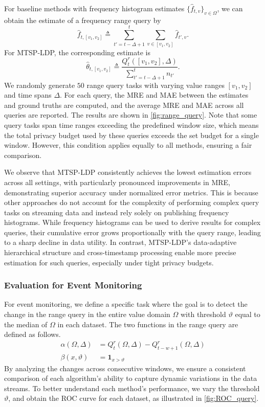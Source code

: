 \documentclass[acmsmall]{acmart}
\newcommand{\indr}[1]{\mathbf{1}_{#1}}
\begin{document}


For baseline methods with frequency histogram estimates
$\{\hat{f}_{t,v}\}_{v\in\Omega}$, we can obtain the estimate of a frequency range query by
\[
  \hat{f}_{t,[v_1,v_2]}
  \triangleq \sum_{t'=t-\Delta+1}^t\sum_{v\in[v_1,v_2]} \hat{f}_{t',v}.
\]
For MTSP-LDP, the corresponding estimate is
\[
  \hat\theta_{t,[v_1,v_2]}
  \triangleq \frac{Q_t^r([v_1,v_2],\Delta)}{\sum_{t'=t-\Delta+1}^t n_{t'}}.
\]
We randomly generate $50$ range query tasks with varying value ranges
$[v_1,v_2]$ and time spans $\Delta$.
For each query, the MRE and MAE between the estimates and ground truths are
computed, and the average MRE and MAE across all queries are reported.
The results are shown in \cref{fig:range_query}.
Note that some query tasks span time ranges exceeding the predefined window
size, which means the total privacy budget used by these queries exceeds the set
budget for a single window.
However, this condition applies equally to all methods, ensuring a fair
comparison.

We observe that MTSP-LDP consistently achieves the lowest estimation errors
across all settings, with particularly pronounced improvements in MRE,
demonstrating superior accuracy under normalized error metrics.
This is because other approaches do not account for the complexity of performing
complex query tasks on streaming data and instead rely solely on publishing
frequency histograms.
While frequency histograms can be used to derive results for complex queries,
their cumulative error grows proportionally with the query range, leading to a
sharp decline in data utility.
In contrast, MTSP-LDP's data-adaptive hierarchical structure and cross-timestamp
processing enable more precise estimation for such queries, especially under
tight privacy budgets.


\subsubsection{Evaluation for Event Monitoring}

For event monitoring, we define a specific task where the goal is to detect the
change in the range query in the entire value domain $\Omega$ with threshold
$\vartheta$ equal to the median of $\Omega$ in each dataset.
The two functions in the range query are defined as follows.
\begin{align*}
  \alpha(\Omega,\Delta) &= Q_t^r(\Omega,\Delta)-Q_{t-w+1}^r(\Omega,\Delta)\\
  \beta(x,\vartheta) &= \indr{x>\vartheta}
\end{align*}
By analyzing the changes across consecutive windows, we ensure a consistent
comparison of each algorithm's ability to capture dynamic variations in the data
streams.
To better understand each method's performance, we vary the threshold
$\vartheta$, and obtain the ROC curve for each dataset, as illustrated in
\cref{fig:ROC_query}.
\end{document}
